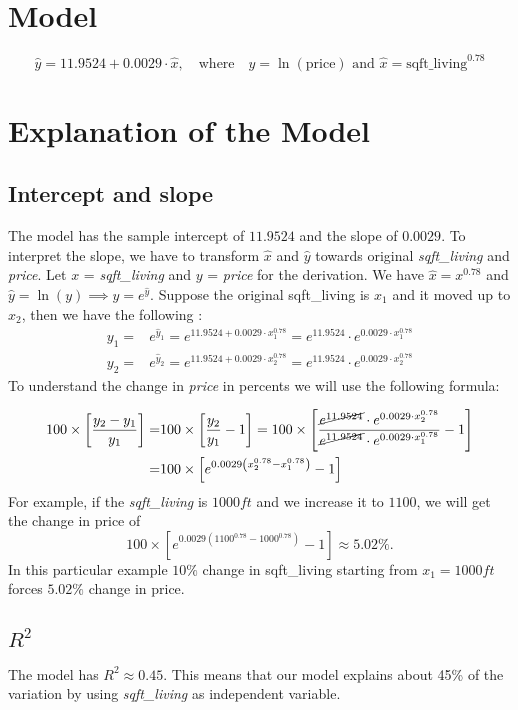 \documentclass[10pt]{article}
\begin{document}
	\nopagebreak
\section*{Model}
	\[\hat{y}=11.9524+0.0029\cdot \hat{x},\quad \text{where}\quad  \hat{y}=\ln (\text{price})\text{ and } \hat{x} = \text{sqft\_living}^{0.78}  \]
\section*{Explanation of the Model}
\subsection*{Intercept and slope}
The model has the sample intercept of \(11.9524\) and the slope of \(0.0029\).  To interpret the slope, we have to transform \(\hat{x}\) and \(\hat{y}\) towards original {\it sqft\_living} and {\it price}. Let \(x\) = {\it sqft\_living}  and \(y\) = {\it price} for the derivation. We have  \(\hat{x} = x^{0.78}\) and \(\hat{y} = \ln (y)\implies y  = e^{\hat{y}}\). Suppose the original sqft\_living is \(x_1\) and it moved up to \(x_2\), then we have the following :
\begin{align*}
	y_1 =& e^{\hat{y}_1 }= e^{11.9524+0.0029\cdot x_1^{0.78}}  = e^{11.9524}\cdot e^{0.0029\cdot x_1^{0.78}}\\
	y_2 =& e^{\hat{y}_2 }= e^{11.9524+0.0029\cdot x_2^{0.78}}  = e^{11.9524}\cdot e^{0.0029\cdot x_2^{0.78}}
\end{align*}
To understand the change in {\it price} in percents we will use the following formula:

\begin{align*}
100 \times \left[\frac{y_2-y_1}{y_1} \right] =& 100 \times \left[\frac{y_2}{y_1} - 1\right] = 100\times \left[\frac{ \cancel{e^{11.9524}}\cdot e^{0.0029\cdot x_2^{0.78}}}{\cancel{e^{11.9524}}\cdot e^{0.0029\cdot x_1^{0.78}}} -1 \right] \\
=& 100 \times \left[ e^{0.0029\left( x_2^{0.78} - x_1^{0.78} \right)} -1 \right]
\end{align*}
For example, if the {\it sqft\_living} is \(1000ft\) and we increase it to \(1100\), we will get the change in price of
 \[100\times \left[e^{0.0029(1100^{0.78}-1000^{0.78})}-1\right] \approx 5.02\%. \]
In this particular example \(10\%\) change in sqft\_living starting from \(x_1 = 1000ft\) forces \(5.02\%\) change in price.
\subsection*{\textbf{\(R^2 \)}}
The model has \(R^2\approx 0.45\).  This means that our model explains about 45\% of the variation by using {\it sqft\_living} as independent variable.
\end{document}
